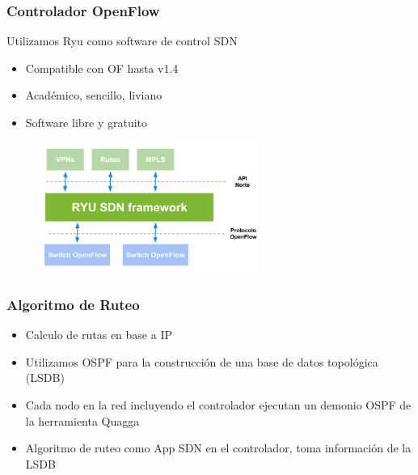 \documentclass{beamer}
\begin{document}
\begin{frame}
\frametitle{Controlador OpenFlow} 

Utilizamos Ryu como software de control SDN

\begin{itemize}
\item Compatible con OF hasta v1.4
\item Acad\'emico, sencillo, liviano
\item Software libre y gratuito
\end{itemize}

\begin{figure}[H]
\centering
\includegraphics[width=0.65\textwidth]{imagenes/ryuarch.png}
\end{figure}

\end{frame}

\begin{frame}
\frametitle{Algoritmo de Ruteo} 

\begin{itemize}
\item Calculo de rutas en base a IP
\item Utilizamos OSPF para la construcci\'on de una base de datos topol\'ogica (LSDB)
\item Cada nodo en la red incluyendo el controlador ejecutan un demonio OSPF de la herramienta Quagga
\item Algoritmo de ruteo como App SDN en el controlador, toma informaci\'on de la LSDB
\end{itemize}

\end{frame}

%
%
%
\end{document}
